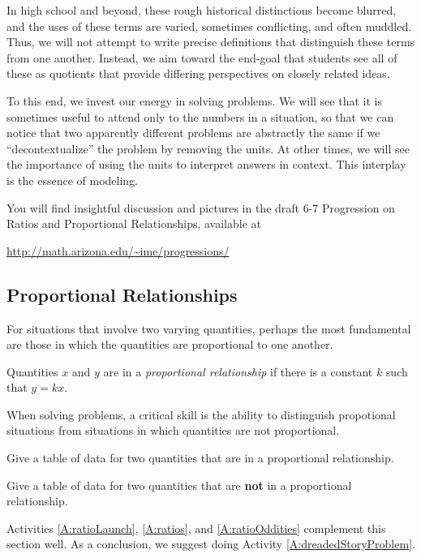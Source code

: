 In high school and beyond, these rough historical distinctions become blurred, and the uses of these terms are varied, sometimes conflicting, and often muddled.  Thus, we will not attempt to write precise definitions that distinguish these terms from one another.  Instead, we aim toward the end-goal that students see all of these as quotients that provide differing perspectives on closely related ideas.  

To this end, we invest our energy in solving problems.  We will see that it is sometimes useful to attend only to the numbers in a situation, so that we can notice that two apparently different problems are abstractly the same if we ``decontextualize'' the problem by removing the units.  At other times, we will see the importance of using the units to interpret answers in context.  This interplay is the essence of modeling.


\begin{teachingnote}
You will find insightful discussion and pictures in the draft 6-7 Progression on Ratios and Proportional Relationships, available at 

\url{http://math.arizona.edu/~ime/progressions/}
\end{teachingnote}

\subsection{Proportional Relationships}
For situations that involve two varying quantities, perhaps the most fundamental are those in which the quantities are proportional to one another.  
\begin{definition}
Quantities $x$ and $y$ are in a \emph{proportional relationship} if there is a constant $k$ such that $y=kx$.  
\end{definition}
When solving problems, a critical skill is the ability to distinguish propotional situations from situations in which quantities are not proportional.  
\begin{question}
Give a table of data for two quantities that are in a proportional relationship.  
\end{question}
\QM

\begin{question}
Give a table of data for two quantities that are \textbf{not} in a proportional relationship.  
\end{question}
\QM


\begin{activitynote}
Activities \ref{A:ratioLaunch}, \ref{A:ratios},  and \ref{A:ratioOddities} complement this section well. 
As a conclusion, we suggest doing Activity \ref{A:dreadedStoryProblem}.
\end{activitynote}

